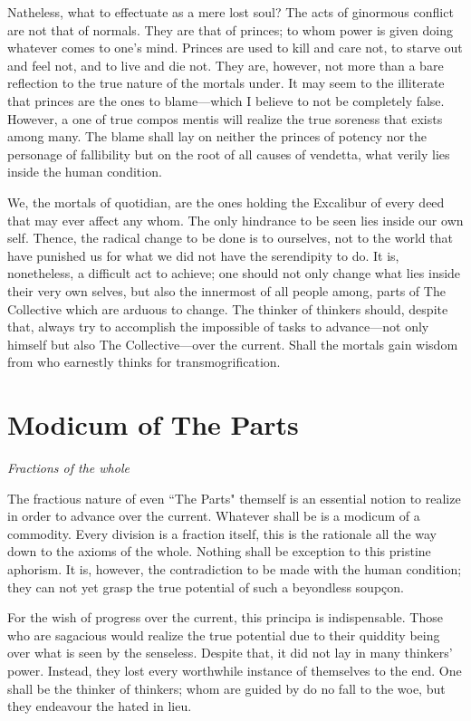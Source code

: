 \documentclass[oneside]{book}
\begin{document}
Natheless, what to effectuate as a mere lost soul? The acts of ginormous
conflict are not that of normals. They are that of princes; to whom power is
given doing whatever comes to one's mind. Princes are used to kill and care not,
to starve out and feel not, and to live and die not. They are, however, not more
than a bare reflection to the true nature of the mortals under. It may seem to
the illiterate that princes are the ones to blame—which I believe to not be
completely false. However, a one of true compos mentis will realize the true
soreness that exists among many. The blame shall lay on neither the princes of
potency nor the personage of fallibility but on the root of all causes of
vendetta, what verily lies inside the human condition.

We, the mortals of quotidian, are the ones holding the Excalibur of every deed
that may ever affect any whom. The only hindrance to be seen lies inside our own
self. Thence, the radical change to be done is to ourselves, not to the world
that have punished us for what we did not have the serendipity to do. It is,
nonetheless, a difficult act to achieve; one should not only change what lies
inside their very own selves, but also the innermost of all people among, parts
of The Collective which are arduous to change. The thinker of thinkers should,
despite that, always try to accomplish the impossible of tasks to advance—not
only himself but also The Collective—over the current. Shall the mortals gain
wisdom from who earnestly thinks for transmogrification.

\section{Modicum of The Parts}
\textit{Fractions of the whole}

The fractious nature of even ``The Parts" themself is an essential notion to
realize in order to advance over the current. Whatever shall be is a modicum of
a commodity. Every division is a fraction itself, this is the rationale all the
way down to the axioms of the whole. Nothing shall be exception to this pristine
aphorism. It is, however, the contradiction to be made with the human condition;
they can not yet grasp the true potential of such a beyondless soupçon.

For the wish of progress over the current, this principa is indispensable. Those
who are sagacious would realize the true potential due to their quiddity being
over what is seen by the senseless. Despite that, it did not lay in many
thinkers' power. Instead, they lost every worthwhile instance of themselves to
the end. One shall be the thinker of thinkers; whom are guided by do no fall to
the woe, but they endeavour the hated in lieu.
\end{document}

